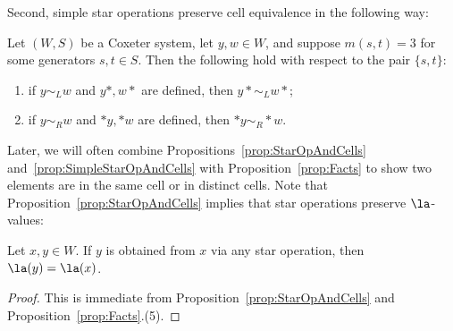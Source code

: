 \noindent Second, simple star operations preserve cell equivalence in the following way: 
\begin{prop}[{\cite[Corollary 4.3]{KL}}]
    \label{prop:SimpleStarOpAndCells} 
    Let $(W,S)$ be a Coxeter system, let $y,w\in W$, and suppose $m(s,t)=3$ for some generators $s,t\in S$.  Then
    the following hold with respect to the pair $\{s,t\}$:
    \begin{enumerate}
        \item if  $y\sim_L w$ and $y*,w*$ are defined, then $y*\sim_L w*$;
        \item if $y\sim_R w$ and $*y,*w$ are defined, then $*y\sim_R *w$. 
    \end{enumerate}
\end{prop}

\noindent 
Later, we will often combine Propositions~\ref{prop:StarOpAndCells} and~\ref{prop:SimpleStarOpAndCells} with
Proposition~\ref{prop:Facts} to show two elements are in the same cell or in distinct cells. Note that
Proposition~\ref{prop:StarOpAndCells} implies that star operations preserve $\la$-values:

\begin{corollary}
    Let $x,y\in W$. If $y$ is obtained from $x$ via any star operation, then $\la(y)=\la(x)$.
    \label{coro:starA}
\end{corollary}
\begin{proof}
    This is immediate from Proposition~\ref{prop:StarOpAndCells} and Proposition~\ref{prop:Facts}.(5).
\end{proof}

